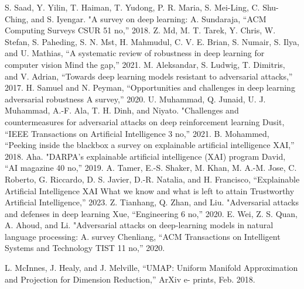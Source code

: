 \documentclass[10pt, conference, a4paper, final]{IEEEtran}
\begin{document}
\begin{thebibliography}{01}

    S. Saad, Y. Yilin, T. Haiman, T. Yudong, P. R. Maria, S. Mei-Ling, C. Shu-Ching, and S. Iyengar. "A survey on deep learning: A. Sundaraja, “ACM Computing Surveys CSUR 51 no,” 2018.
     Z. Md, M. T. Tarek, Y. Chris, W. Stefan, S. Paheding, S. N. Mst, H. Mahmudul, C. V. E. Brian, 
    S. Numair, S. Ilya, and U. Mathias, “A systematic review of robustness in deep learning for computer vision Mind the gap,” 2021.
    M. Aleksandar, S. Ludwig, T. Dimitris, and V. Adrian, “Towards deep learning models resistant to adversarial attacks,” 2017.
    H. Samuel and N. Peyman, “Opportunities and challenges in deep learning adversarial robustness A survey,” 2020.
    U. Muhammad, Q. Junaid, U. J. Muhammad, A.-F. Ala, T. H. Dinh, and Niyato. "Challenges and countermeasures for adversarial attacks on deep reinforcement learning Dusit, “IEEE Transactions on Artificial Intelligence 3 no,” 2021.
    B. Mohammed, “Peeking inside the blackbox a survey on explainable artificial intelligence XAI,” 2018.
    Aha. "DARPA’s explainable artificial intelligence (XAI) program David, “AI magazine 40 no,” 2019.
    A. Tamer, E.-S. Shaker, M. Khan, M. A.-M. Jose, C. Roberto, G. Riccardo, D. S. Javier, D.-R. Natalia, and H. Francisco, “Explainable Artificial Intelligence XAI What we know and what is left to attain Trustworthy Artificial Intelligence,” 2023.
    Z. Tianhang, Q. Zhan, and Liu. "Adversarial attacks and defenses in deep learning Xue, “Engineering 6 no,” 2020.
    E. Wei, Z. S. Quan, A. Ahoud, and Li. "Adversarial attacks on deep-learning models in natural language processing: A. survey Chenliang, “ACM Transactions on Intelligent Systems and Technology TIST 11 no,” 2020.





	L. McInnes, J. Healy, and J. Melville, “UMAP: Uniform Manifold Approximation and Projection for Dimension Reduction,” ArXiv e- prints, Feb. 2018.
   

\end{thebibliography}
\end{document}
